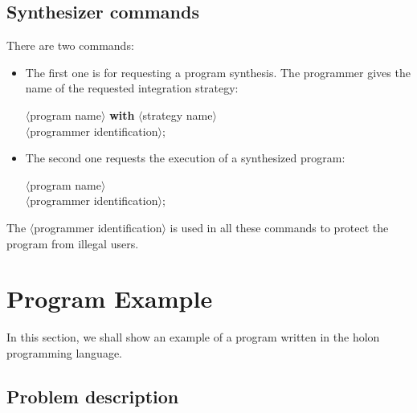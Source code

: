 \documentclass[openany,nobib]{tufte-book}
\newcommand{\kw}[1]{{\bf #1}}
\newcommand{\sym}[1]{$\langle$#1$\rangle$}
\begin{document}
\section{Synthesizer commands}

\medskip\noindent
There are two commands:
\begin{itemize}
    \item[(A)] The first one is for requesting a program synthesis. The
programmer gives the name of the requested integration strategy:

    \smallskip
    \-\hspace{0.3cm}\kw{synthesize} \sym{program name} \kw{with}
\sym{strategy name} \\
    \-\hspace{0.6cm}\kw{by} \sym{programmer identification};

    \smallskip
    \item[(B)] The second one requests the execution of a synthesized program:

    \smallskip
    \-\hspace{0.3cm}\kw{execute} \sym{program name}\\
    \-\hspace{0.6cm}\kw{by} \sym{programmer identification};

    \smallskip
\end{itemize}
The \sym{programmer identification} is used in all these commands to protect
the program from illegal users.

\chapter{Program Example}
\label{ch:prog}

In this section, we shall show an example of a program written in the holon
programming language.

\section{Problem description}
\end{document}
